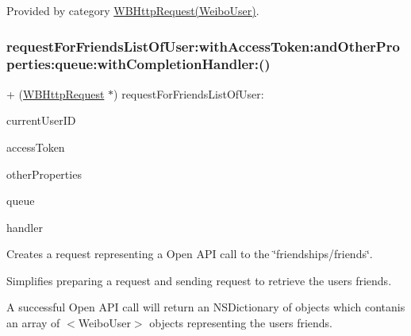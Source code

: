 Provided by category \mbox{\hyperlink{category_w_b_http_request_07_weibo_user_08_a6bec26ae942e00b30352846353c10f4d}{W\+B\+Http\+Request(\+Weibo\+User)}}.

\mbox{\label{interface_w_b_http_request_a6bec26ae942e00b30352846353c10f4d}} 
\subsubsection{\texorpdfstring{request\+For\+Friends\+List\+Of\+User\+:with\+Access\+Token\+:and\+Other\+Properties\+:queue\+:with\+Completion\+Handler\+:()}{requestForFriendsListOfUser:withAccessToken:andOtherProperties:queue:withCompletionHandler:()}\hspace{0.1cm}{\footnotesize\ttfamily [3/3]}}
{\footnotesize\ttfamily + (\mbox{\hyperlink{interface_w_b_http_request}{W\+B\+Http\+Request}} $\ast$) request\+For\+Friends\+List\+Of\+User\+: \begin{DoxyParamCaption}\item[{(N\+S\+String $\ast$)}]{current\+User\+ID }\item[{withAccessToken:(N\+S\+String $\ast$)}]{access\+Token }\item[{andOtherProperties:(N\+S\+Dictionary $\ast$)}]{other\+Properties }\item[{queue:(N\+S\+Operation\+Queue $\ast$)}]{queue }\item[{withCompletionHandler:(W\+B\+Request\+Handler)}]{handler }\end{DoxyParamCaption}}

Creates a request representing a Open A\+PI call to the \char`\"{}friendships/friends\char`\"{}.

Simplifies preparing a request and sending request to retrieve the user\textquotesingle{}s friends.

A successful Open A\+PI call will return an N\+S\+Dictionary of objects which contanis an array of $<$\+Weibo\+User$>$ objects representing the user\textquotesingle{}s friends.

